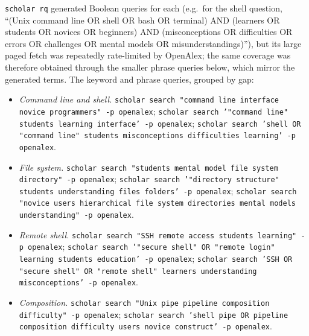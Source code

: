 \texttt{scholar rq} generated Boolean queries for each (e.g.\ for the shell
question, \enquote{(Unix command line OR shell OR bash OR terminal) AND
(learners OR students OR novices OR beginners) AND (misconceptions OR
difficulties OR errors OR challenges OR mental models OR misunderstandings)}),
but its large paged fetch was repeatedly rate-limited by OpenAlex; the same
coverage was therefore obtained through the smaller phrase queries below,
which mirror the generated terms.
The keyword and phrase queries, grouped by gap:

\begin{itemize}
  \item \emph{Command line and shell.}
    \texttt{scholar search "command line interface novice programmers" -p
    openalex}; \texttt{scholar search '"command line" students learning
    interface' -p openalex}; \texttt{scholar search 'shell OR "command line"
    students misconceptions difficulties learning' -p openalex}.
  \item \emph{File system.}
    \texttt{scholar search "students mental model file system directory" -p
    openalex}; \texttt{scholar search '"directory structure" students
    understanding files folders' -p openalex}; \texttt{scholar search "novice
    users hierarchical file system directories mental models understanding"
    -p openalex}.
  \item \emph{Remote shell.}
    \texttt{scholar search "SSH remote access students learning" -p openalex};
    \texttt{scholar search '"secure shell" OR "remote login" learning students
    education' -p openalex}; \texttt{scholar search 'SSH OR "secure shell" OR
    "remote shell" learners understanding misconceptions' -p openalex}.
  \item \emph{Composition.}
    \texttt{scholar search "Unix pipe pipeline composition difficulty" -p
    openalex}; \texttt{scholar search 'shell pipe OR pipeline composition
    difficulty users novice construct' -p openalex}.
\end{itemize}

